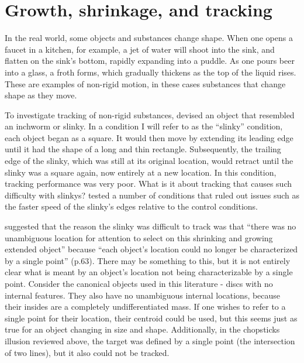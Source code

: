 \documentclass[
]{book}
\begin{document}
\hypertarget{growth-shrinkage-and-tracking}{%
\section{Growth, shrinkage, and tracking}\label{growth-shrinkage-and-tracking}}

In the real world, some objects and substances change shape. When one opens a faucet in a kitchen, for example, a jet of water will shoot into the sink, and flatten on the sink's bottom, rapidly expanding into a puddle. As one pours beer into a glass, a froth forms, which gradually thickens as the top of the liquid rises. These are examples of non-rigid motion, in these cases substances that change shape as they move.

To investigate tracking of non-rigid substances, \citet{vanmarleAttentiveTrackingObjects2003} devised an object that resembled an inchworm or slinky. In a condition I will refer to as the ``slinky'' condition, each object began as a square. It would then move by extending its leading edge until it had the shape of a long and thin rectangle. Subsequently, the trailing edge of the slinky, which was still at its original location, would retract until the slinky was a square again, now entirely at a new location. In this condition, tracking performance was very poor. What is it about tracking that causes such difficulty with slinkys? \citet{howeVisuallyTrackingLocalizing2013} tested a number of conditions that ruled out issues such as the faster speed of the slinky's edges relative to the control conditions.

\citet{schollWhatHaveWe2008} suggested that the reason the slinky was difficult to track was that ``there was no unambiguous location for attention to select on this shrinking and growing extended object'' because ``each object's location could no longer be characterized by a single point'' (p.63). There may be something to this, but it is not entirely clear what is meant by an object's location not being characterizable by a single point. Consider the canonical objects used in this literature - discs with no internal features. They also have no unambiguous internal locations, because their insides are a completely undifferentiated mass. If one wishes to refer to a single point for their location, their centroid could be used, but this seems just as true for an object changing in size and shape. Additionally, in the chopsticks illusion reviewed above, the target was defined by a single point (the intersection of two lines), but it also could not be tracked.
\end{document}
